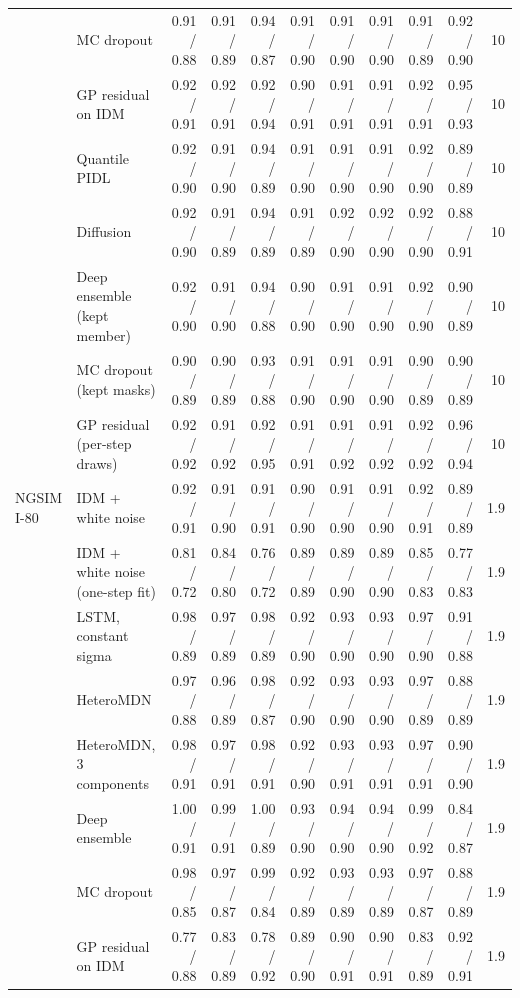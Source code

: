 \begin{longtable}{llrrrrrrrrr}
 & MC dropout & 0.91 / 0.88 & 0.91 / 0.89 & 0.94 / 0.87 & 0.91 / 0.90 & 0.91 / 0.90 & 0.91 / 0.90 & 0.91 / 0.89 & 0.92 / 0.90 & 10 \\
 & GP residual on IDM & 0.92 / 0.91 & 0.92 / 0.91 & 0.92 / 0.94 & 0.90 / 0.91 & 0.91 / 0.91 & 0.91 / 0.91 & 0.92 / 0.91 & 0.95 / 0.93 & 10 \\
 & Quantile PIDL & 0.92 / 0.90 & 0.91 / 0.90 & 0.94 / 0.89 & 0.91 / 0.90 & 0.91 / 0.90 & 0.91 / 0.90 & 0.92 / 0.90 & 0.89 / 0.89 & 10 \\
 & Diffusion & 0.92 / 0.90 & 0.91 / 0.89 & 0.94 / 0.89 & 0.91 / 0.89 & 0.92 / 0.90 & 0.92 / 0.90 & 0.92 / 0.90 & 0.88 / 0.91 & 10 \\
 & Deep ensemble (kept member) & 0.92 / 0.90 & 0.91 / 0.90 & 0.94 / 0.88 & 0.90 / 0.90 & 0.91 / 0.90 & 0.91 / 0.90 & 0.92 / 0.90 & 0.90 / 0.89 & 10 \\
 & MC dropout (kept masks) & 0.90 / 0.89 & 0.90 / 0.89 & 0.93 / 0.88 & 0.91 / 0.90 & 0.91 / 0.90 & 0.91 / 0.90 & 0.90 / 0.89 & 0.90 / 0.89 & 10 \\
 & GP residual (per-step draws) & 0.92 / 0.92 & 0.91 / 0.92 & 0.92 / 0.95 & 0.91 / 0.91 & 0.91 / 0.92 & 0.91 / 0.92 & 0.92 / 0.92 & 0.96 / 0.94 & 10 \\
\midrule
NGSIM I-80 & IDM + white noise & 0.92 / 0.91 & 0.91 / 0.90 & 0.91 / 0.91 & 0.90 / 0.90 & 0.91 / 0.90 & 0.91 / 0.90 & 0.92 / 0.91 & 0.89 / 0.89 & 1.9 \\
 & IDM + white noise (one-step fit) & 0.81 / 0.72 & 0.84 / 0.80 & 0.76 / 0.72 & 0.89 / 0.89 & 0.89 / 0.90 & 0.89 / 0.90 & 0.85 / 0.83 & 0.77 / 0.83 & 1.9 \\
 & LSTM, constant sigma & 0.98 / 0.89 & 0.97 / 0.89 & 0.98 / 0.89 & 0.92 / 0.90 & 0.93 / 0.90 & 0.93 / 0.90 & 0.97 / 0.90 & 0.91 / 0.88 & 1.9 \\
 & HeteroMDN & 0.97 / 0.88 & 0.96 / 0.89 & 0.98 / 0.87 & 0.92 / 0.90 & 0.93 / 0.90 & 0.93 / 0.90 & 0.97 / 0.89 & 0.88 / 0.89 & 1.9 \\
 & HeteroMDN, 3 components & 0.98 / 0.91 & 0.97 / 0.91 & 0.98 / 0.91 & 0.92 / 0.90 & 0.93 / 0.91 & 0.93 / 0.91 & 0.97 / 0.91 & 0.90 / 0.90 & 1.9 \\
 & Deep ensemble & 1.00 / 0.91 & 0.99 / 0.91 & 1.00 / 0.89 & 0.93 / 0.90 & 0.94 / 0.90 & 0.94 / 0.90 & 0.99 / 0.92 & 0.84 / 0.87 & 1.9 \\
 & MC dropout & 0.98 / 0.85 & 0.97 / 0.87 & 0.99 / 0.84 & 0.92 / 0.89 & 0.93 / 0.89 & 0.93 / 0.89 & 0.97 / 0.87 & 0.88 / 0.89 & 1.9 \\
 & GP residual on IDM & 0.77 / 0.88 & 0.83 / 0.89 & 0.78 / 0.92 & 0.89 / 0.90 & 0.90 / 0.91 & 0.90 / 0.91 & 0.83 / 0.89 & 0.92 / 0.91 & 1.9 \\

\end{longtable}
